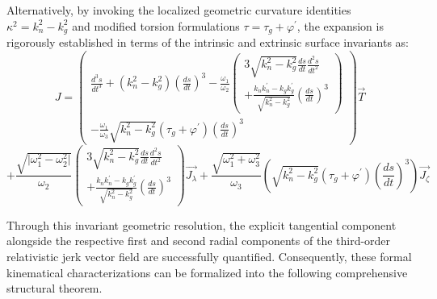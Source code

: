 \documentclass[reqno]{amsart}
\theoremstyle{plain}
\numberwithin{equation}{section}
\begin{document}
Alternatively, by invoking the localized geometric curvature identities $\kappa^{2} = k_{n}^{2} - k_{g}^{2}$ and modified torsion formulations $\tau = \tau_{g} + \varphi^{\prime}$, the expansion is rigorously established in terms of the intrinsic and extrinsic surface invariants as:
\begin{equation*}
J=\left( 
\begin{array}{c}
\frac{d^{3}s}{dt^{3}}+\left( k_{n}^{2}-k_{g}^{2}\right) \left( \frac{ds}{dt}%
\right) ^{3}-\frac{\omega _{1}}{\omega _{2}}\left( 
\begin{array}{c}
3\sqrt{k_{n}^{2}-k_{g}^{2}}\frac{ds}{dt}\frac{d^{2}s}{dt^{2}} \\ 
+\frac{k_{n}k_{n}^{\prime }-k_{g}k_{g}^{\prime }}{\sqrt{k_{n}^{2}-k_{g}^{2}}}%
\left( \frac{ds}{dt}\right) ^{3}%
\end{array}%
\right) \\ 
-\frac{\omega _{1}}{\omega _{3}}\sqrt{k_{n}^{2}-k_{g}^{2}}(\tau _{g}+\varphi
^{\prime })\left( \frac{ds}{dt}\right) ^{3}%
\end{array}%
\right) \overrightarrow{T}
\end{equation*}%
\begin{equation}
+\frac{\sqrt{\vert\omega _{1}^{2}-\omega _{2}^{2}\vert}}{\omega _{2}}\left( 
\begin{array}{c}
3\sqrt{k_{n}^{2}-k_{g}^{2}}\frac{ds}{dt}\frac{d^{2}s}{dt^{2}} \\ 
+\frac{k_{n}k_{n}^{\prime }-k_{g}k_{g}^{\prime }}{\sqrt{k_{n}^{2}-k_{g}^{2}}}%
\left( \frac{ds}{dt}\right) ^{3}%
\end{array}%
\right) \overrightarrow{J_{\lambda }}+\frac{\sqrt{\omega _{1}^{2}+\omega
_{3}^{2}}}{\omega _{3}}\left( \sqrt{k_{n}^{2}-k_{g}^{2}}(\tau _{g}+\varphi
^{\prime })\left( \frac{ds}{dt}\right) ^{3}\right) \overrightarrow{J_{\zeta }%
}  \tag{3.14}
\end{equation}

Through this invariant geometric resolution, the explicit tangential component alongside the respective first and second radial components of the third-order relativistic jerk vector field are successfully quantified. Consequently, these formal kinematical characterizations can be formalized into the following comprehensive structural theorem.
\end{document}
